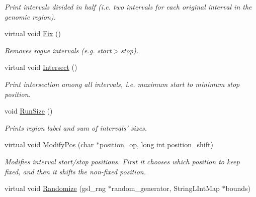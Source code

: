 \begin{CompactItemize}
\begin{CompactList}\small\item\em Print intervals divided in half (i.e. two intervals for each original interval in the genomic region). \item\end{CompactList}\item 
\hypertarget{classGenomicRegion_048d2182b212789b182c2c82a7ac131e}{
virtual void \hyperlink{classGenomicRegion_048d2182b212789b182c2c82a7ac131e}{Fix} ()}
\label{classGenomicRegion_048d2182b212789b182c2c82a7ac131e}

\begin{CompactList}\small\item\em Removes rogue intervals (e.g. start$>$stop). \item\end{CompactList}\item 
\hypertarget{classGenomicRegion_8075e77ab6296b59506857cc21ee4c9d}{
virtual void \hyperlink{classGenomicRegion_8075e77ab6296b59506857cc21ee4c9d}{Intersect} ()}
\label{classGenomicRegion_8075e77ab6296b59506857cc21ee4c9d}

\begin{CompactList}\small\item\em Print intersection among all intervals, i.e. maximum start to minimum stop position. \item\end{CompactList}\item 
\hypertarget{classGenomicRegion_08db190bc63e6f1d6fc90679dc5e6868}{
void \hyperlink{classGenomicRegion_08db190bc63e6f1d6fc90679dc5e6868}{RunSize} ()}
\label{classGenomicRegion_08db190bc63e6f1d6fc90679dc5e6868}

\begin{CompactList}\small\item\em Prints region label and sum of intervals' sizes. \item\end{CompactList}\item 
virtual void \hyperlink{classGenomicRegion_0721b07af0850057e4ab9cd416ecac2f}{ModifyPos} (char $\ast$position\_\-op, long int position\_\-shift)
\begin{CompactList}\small\item\em Modifies interval start/stop positions. First it chooses which position to keep fixed, and then it shifts the non-fixed position. \item\end{CompactList}\item 
\hypertarget{classGenomicRegion_222b3b8f567c306ee5a71ea3a720ef43}{
virtual void \hyperlink{classGenomicRegion_222b3b8f567c306ee5a71ea3a720ef43}{Randomize} (gsl\_\-rng $\ast$random\_\-generator, StringLIntMap $\ast$bounds)}
\label{classGenomicRegion_222b3b8f567c306ee5a71ea3a720ef43}


\end{CompactItemize}

